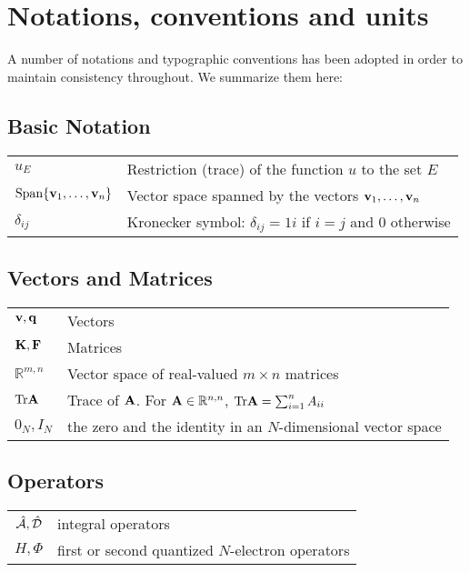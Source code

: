 \chapter*{Notations, conventions and units}

A number of notations and typographic conventions has been adopted in
order to maintain consistency throughout. We summarize them here:

\section*{Basic Notation}
\begin{table*}[!h]
\begin{tabular}{l l}
  $u_E$ & Restriction (trace) of the function $u$ to the set $E$ \\
  $\mathop{}\!\mathrm{Span}\{\mathbf{v}_1, \ldots, \mathbf{v}_n\}$ & Vector space spanned by the
  vectors $\mathbf{v}_1, \ldots, \mathbf{v}_n$ \\
  $\delta_{ij}$ & Kronecker symbol: $\delta_{ij}=1i$ if $i=j$ and 0
  otherwise
\end{tabular}
\end{table*}

\section*{Vectors and Matrices}
\begin{tabular}{l l}
 $\mathbf{v}, \mathbf{q}$ & Vectors \\
 $\mathbf{K}, \mathbf{F}$ & Matrices \\
 $\mathbb{R}^{m, n}$ & Vector space of real-valued $m\times n$ matrices
 \\
 $\mathrm{Tr}\mathbf{A}$ & Trace of $\mathbf{A}$. For $\mathbf{A}\in\mathbb{R}^{n, n}$,
 $\mathrm{Tr}\mathbf{A}=\sum_{i=1}^n A_{ii}$ \\
 $0_N, I_N$ & the zero and the identity in an $N$-dimensional vector space
\end{tabular}

\section*{Operators}
\begin{tabular}{c l}
 $\hat{\mathcal{A}}, \hat{\mathcal{D}}$ & integral operators \\
 $H, \varPhi$ & first or second quantized $N$-electron operators
\end{tabular}

